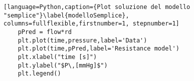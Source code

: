 \begin{lstlisting}[language=Python,caption={Plot soluzione del modello "semplice"}\label{modelloSemplice}, columns=fullflexible,firstnumber=1, stepnumber=1]
    pPred = flow*rd
    plt.plot(time,pressure,label='Data')
    plt.plot(time,pPred,label='Resistance model')
    plt.xlabel("time [s]")
    plt.ylabel("$P\,[mmHg]$")
    plt.legend()
\end{lstlisting}